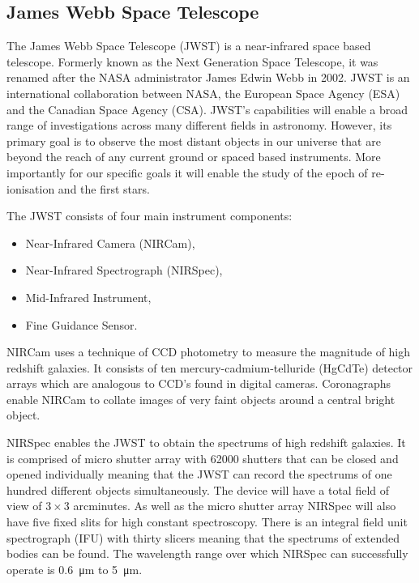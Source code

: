 
\subsection{James Webb Space Telescope} %
\label{sub:james_webb_space_telescope}
	The James Webb Space Telescope (JWST) is a near-infrared space based telescope. Formerly known as the Next Generation Space Telescope, it was renamed after the NASA administrator James Edwin Webb in 2002. JWST is an international collaboration between NASA, the European Space Agency (ESA) and the Canadian Space Agency (CSA). JWST’s capabilities will enable a broad range of investigations across many different fields in astronomy. However, its primary goal is to observe the most distant objects in our universe that are beyond the reach of any current ground or spaced based instruments. More importantly for our specific goals it will enable the study of the epoch of re-ionisation and the first stars.

	The JWST consists of four main instrument components:
	\begin{itemize}
		\item Near-Infrared Camera (NIRCam),
		\item Near-Infrared Spectrograph (NIRSpec),
		\item Mid-Infrared Instrument,
		\item Fine Guidance Sensor.
	\end{itemize}

	NIRCam uses a technique of CCD photometry to measure the magnitude of high redshift galaxies. It consists of ten mercury-cadmium-telluride (HgCdTe) detector arrays which are analogous to CCD’s found in digital cameras. Coronagraphs enable NIRCam to collate images of very faint objects around a central bright object.

	NIRSpec enables the JWST to obtain the spectrums of high redshift galaxies. It is comprised of micro shutter array with \num{62000} shutters that can be closed and opened individually meaning that the JWST can record the spectrums of one hundred different objects simultaneously. The device will have a total field of view of $3\times3$ arcminutes. As well as the micro shutter array NIRSpec will also have five fixed slits for high constant spectroscopy. There is an integral field unit spectrograph (IFU) with thirty slicers meaning that the spectrums of extended bodies can be found. The wavelength range over which NIRSpec can successfully operate is \SI{0.6}{\micro\metre} to \SI{5}{\micro\metre}.

